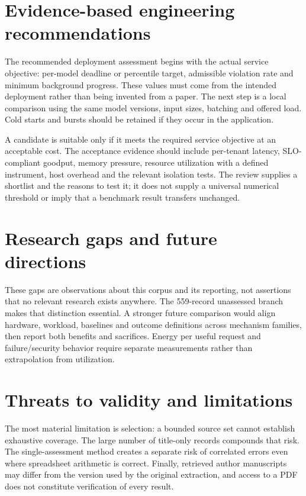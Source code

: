 \section{Evidence-based engineering recommendations}

The recommended deployment assessment begins with the actual service objective: per-model deadline or percentile target, admissible violation rate and minimum background progress. These values must come from the intended deployment rather than being invented from a paper. The next step is a local comparison using the same model versions, input sizes, batching and offered load. Cold starts and bursts should be retained if they occur in the application.

A candidate is suitable only if it meets the required service objective at an acceptable cost. The acceptance evidence should include per-tenant latency, SLO-compliant goodput, memory pressure, resource utilization with a defined instrument, host overhead and the relevant isolation tests. The review supplies a shortlist and the reasons to test it; it does not supply a universal numerical threshold or imply that a benchmark result transfers unchanged.

\section{Research gaps and future directions}

These gaps are observations about this corpus and its reporting, not assertions that no relevant research exists anywhere. The 559-record unassessed branch makes that distinction essential. A stronger future comparison would align hardware, workload, baselines and outcome definitions across mechanism families, then report both benefits and sacrifices. Energy per useful request and failure/security behavior require separate measurements rather than extrapolation from utilization.

\section{Threats to validity and limitations}

The most material limitation is selection: a bounded source set cannot establish exhaustive coverage. The large number of title-only records compounds that risk. The single-assessment method creates a separate risk of correlated errors even where spreadsheet arithmetic is correct. Finally, retrieved author manuscripts may differ from the version used by the original extraction, and access to a PDF does not constitute verification of every result.


